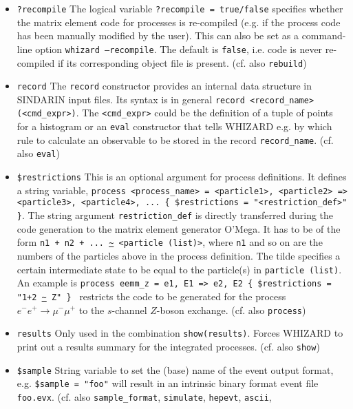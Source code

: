 \documentclass[12pt]{book}
\newcommand{\ttt}[1]{\texttt{#1}}
\begin{document}
\begin{itemize}
\item
\ttt{?recompile} \newline
The logical variable \ttt{?recompile = true/false} specifies whether
the matrix element code for processes is re-compiled (e.g. if the
process code has been manually modified by the user). This can also be
set as a command-line option \ttt{whizard --recompile}. The default is
\ttt{false}, i.e. code is never re-compiled if its corresponding
object file is present. (cf. also \ttt{rebuild})
\item
\ttt{record} \newline
The \ttt{record} constructor provides an internal data structure in
SINDARIN input files. Its syntax is in general \ttt{record
  <record\_name> (<cmd\_expr>)}. The \ttt{<cmd\_expr>} could be the
definition of a tuple of points for a histogram or an \ttt{eval}
constructor that tells WHIZARD e.g. by which rule to calculate an
observable to be stored in the record \ttt{record\_name}.
(cf. also \ttt{eval})
\item
\ttt{\$restrictions} \newline
This is an optional argument for process definitions. It defines a
string variable, \ttt{process <process\_name> = <particle1>,
  <particle2> => <particle3>, <particle4>, ... \{ \$restrictions =
  "<restriction\_def>" \}}. The string argument \ttt{restriction\_def}
is directly transferred during the code generation to the matrix
element generator O'Mega. It has to be of the form \ttt{n1 + n2 + ...
\url{~} <particle (list)>}, where \ttt{n1} and so on are the numbers of the
particles above in the process definition. The tilde specifies a
certain intermediate state to be equal to the particle(s) in
\ttt{particle (list)}. An example is \ttt{process eemm\_z =     e1,
  E1  =>  e2, E2 \{ \$restrictions = "1+2 \url{~} Z" \} } restricts the code
to be generated for the process $e^- e^+ \to \mu^- \mu^+$ to the
$s$-channel $Z$-boson exchange. (cf. also \ttt{process})
\item
\ttt{results} \newline
Only used in the combination \ttt{show(results)}. Forces WHIZARD to
print out a results summary for the integrated processes. 
(cf. also \ttt{show})
\item
\ttt{\$sample} \newline
String variable to set the (base) name of the event output format,
e.g. \ttt{\$sample = "foo"} will result in an intrinsic binary format
event file \ttt{foo.evx}. (cf. also \ttt{sample\_format},
\ttt{simulate}, \ttt{hepevt}, \ttt{ascii},

\end{itemize}
\end{document}
